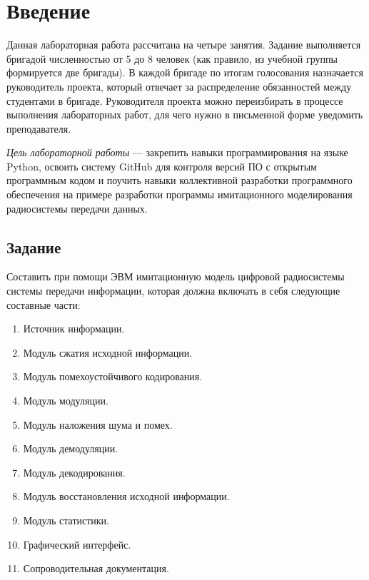 \chapter{Введение}

Данная лабораторная работа рассчитана на четыре занятия. Задание выполняется бригадой численностью от 5 до 8 человек (как правило, из учебной группы формируется две бригады). В каждой бригаде по итогам голосования назначается руководитель проекта, который отвечает за распределение обязанностей между студентами в бригаде. Руководителя проекта можно переизбирать в процессе выполнения лабораторных работ, для чего нужно в письменной форме уведомить преподавателя.

\textit {Цель лабораторной работы} --- закрепить навыки программирования на языке Python, освоить систему GitHub для контроля версий ПО с открытым программным кодом и поучить навыки коллективной разработки программного обеспечения на примере разработки программы имитационного моделирования радиосистемы передачи данных.
 
 
\section{Задание}

Составить при помощи ЭВМ имитационную модель цифровой радиосистемы системы передачи информации, которая должна включать в себя следующие составные части:
\begin{enumerate}
\item	Источник информации.

\item	Модуль сжатия исходной информации.

\item	Модуль помехоустойчивого кодирования.

\item	Модуль модуляции.

\item	Модуль наложения шума и помех.

\item	Модуль демодуляции.

\item	Модуль декодирования.

\item	Модуль восстановления исходной информации.

\item	Модуль статистики.

\item	Графический интерфейс.

\item	Сопроводительная документация.
\end{enumerate}

